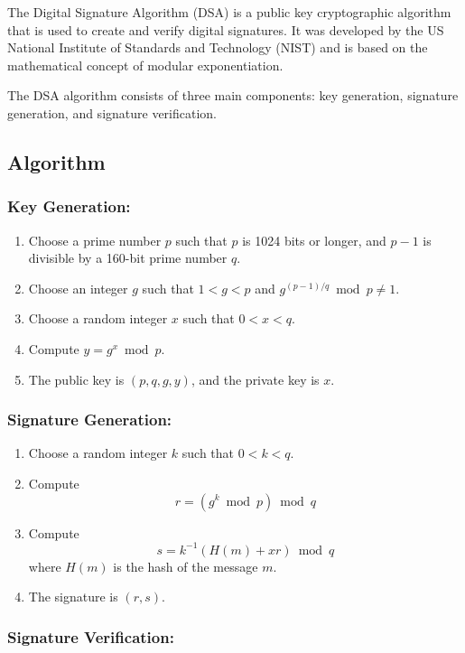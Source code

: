 \documentclass[openany]{book}
\begin{document}
The Digital Signature Algorithm (DSA) is a public key cryptographic algorithm that is used to create and verify digital signatures. It was developed by the US National Institute of Standards and Technology (NIST) and is based on the mathematical concept of modular exponentiation.

The DSA algorithm consists of three main components: key generation, signature generation, and signature verification.

\subsection{Algorithm}

\subsubsection{Key Generation:}

\begin{enumerate}
    \item Choose a prime number $p$ such that $p$ is 1024 bits or longer, and $p-1$ is divisible by a 160-bit prime number $q$.
    \item Choose an integer $g$ such that $1 < g < p$ and $g^{(p-1)/q} \bmod p \neq 1$.
    \item Choose a random integer $x$ such that $0 < x < q$.
    \item Compute $y = g^x \bmod p$.
    \item The public key is $(p, q, g, y)$, and the private key is $x$.
\end{enumerate}

\subsubsection{Signature Generation:}

\begin{enumerate}
    \item Choose a random integer $k$ such that $0 < k < q$.
    \item Compute $$r = (g^k \bmod p) \bmod q$$
    \item Compute $$s = k^{-1} (H(m) + xr) \bmod q$$ where $H(m)$ is the hash of the message $m$.
    \item The signature is $(r, s)$.
\end{enumerate}

\subsubsection{Signature Verification:}
\end{document}
